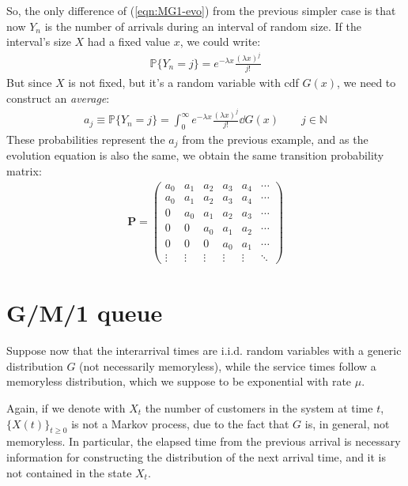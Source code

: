 \documentclass[../template.tex]{subfiles}
\begin{document}
So, the only difference of (\ref{eqn:MG1-evo}) from the previous simpler case is that now $Y_n$ is the number of arrivals during an interval of random size. If the interval's size $X$ had a fixed value $x$, we could write:
\begin{align*}
    \mathbb{P}\{Y_n=j\} = e^{-\lambda x} \frac{(\lambda x)^j}{j!} 
\end{align*}
But since $X$ is not fixed, but it's a random variable with cdf $G(x)$, we need to construct an \textit{average}:
\begin{align*}
    a_j \equiv \mathbb{P}\{Y_n = j\} = \int_0^\infty e^{-\lambda x} \frac{(\lambda x)^j}{j!} \dd{G(x)}  \qquad j \in \mathbb{N}
\end{align*}
These probabilities represent the $a_j$ from the previous example, and as the evolution equation is also the same, we obtain the same transition probability matrix:
\begin{align*}
    \textbf{P} = \left(\begin{array}{cccccc}
    a_0 & a_1  & a_2  & a_3  & a_4  & \cdots \\ 
    a_0 & a_1 & a_2 & a_3 & a_4 & \cdots \\ 
    0 & a_0 & a_1 & a_2 & a_3 & \cdots \\ 
    0 & 0 & a_0 & a_1 & a_2 & \cdots \\ 
    0 & 0 & 0 & a_0 & a_1 & \cdots \\ 
    \vdots & \vdots & \vdots & \vdots & \vdots & \ddots
    \end{array}\right)
\end{align*}

\section{G/M/1 queue}
Suppose now that the interarrival times are i.i.d. random variables with a generic distribution $G$ (not necessarily memoryless), while the service times follow a memoryless distribution, which we suppose to be exponential with rate $\mu$.

\medskip

Again, if we denote with $X_t$ the number of customers in the system at time $t$, $\{X(t)\}_{t \geq 0}$ is not a Markov process, due to the fact that $G$ is, in general, not memoryless. In particular, the elapsed time from the previous arrival is necessary information for constructing the distribution of the next arrival time, and it is not contained in the state $X_t$.
\end{document}
